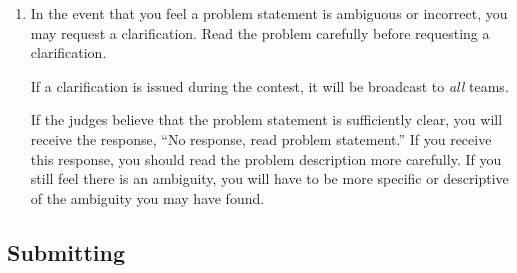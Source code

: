 \begin{enumerate}
\item In the event that you feel a problem statement is ambiguous 
  or incorrect, you may request a clarification.  Read the problem
  carefully before requesting a clarification.  

  If a clarification is issued during the contest, it will be
  broadcast to {\em all} teams.

  If the judges believe that the problem statement is sufficiently
  clear, you will receive the response, ``No response, read problem
  statement.''  If you receive this response, you should read the
  problem description more carefully.  If you still feel there is an
  ambiguity, you will have to be more specific or descriptive of the
  ambiguity you may have found.


\setcounter{savedEnumi}{\value{enumi}}

\end{enumerate}


\subsection*{Submitting}

